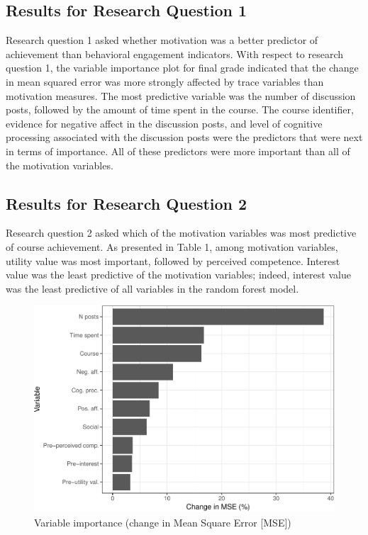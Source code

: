 \documentclass[,acmart]{apa6}
\begin{document}
\subsection{Results for Research Question
1}\label{results-for-research-question-1}

Research question 1 asked whether motivation was a better predictor of
achievement than behavioral engagement indicators. With respect to
research question 1, the variable importance plot for final grade
indicated that the change in mean squared error was more strongly
affected by trace variables than motivation measures. The most
predictive variable was the number of discussion posts, followed by the
amount of time spent in the course. The course identifier, evidence for
negative affect in the discussion posts, and level of cognitive
processing associated with the discussion posts were the predictors that
were next in terms of importance. All of these predictors were more
important than all of the motivation variables.

\subsection{Results for Research Question
2}\label{results-for-research-question-2}

Research question 2 asked which of the motivation variables was most
predictive of course achievement. As presented in Table 1, among
motivation variables, utility value was most important, followed by
perceived competence. Interest value was the least predictive of the
motivation variables; indeed, interest value was the least predictive of
all variables in the random forest model.

\begin{figure}
\centering
\includegraphics{LAK_Manuscript_files/figure-latex/unnamed-chunk-4-1.pdf}
\caption{\label{fig:unnamed-chunk-4}Variable importance (change in Mean
Square Error {[}MSE{]})}
\end{figure}
\end{document}
